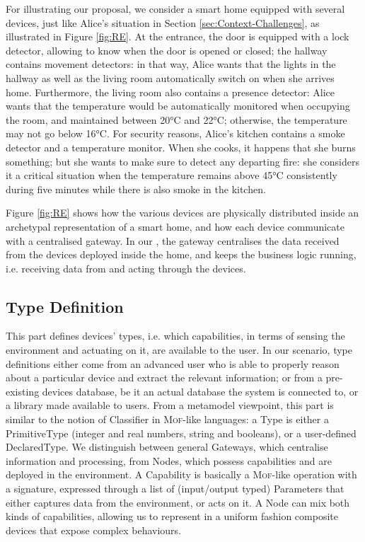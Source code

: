 For illustrating our proposal, we consider a smart home equipped with several devices, just like Alice's situation in Section \ref{sec:Context-Challenges}, as illustrated in Figure \ref{fig:RE}. At the entrance, the door is equipped with a lock detector, allowing to know when the door is opened or closed; the hallway contains movement detectors: in that way, Alice wants that the lights in the hallway as well as the living room automatically switch on when she arrives home. Furthermore, the living room also contains a presence detector: Alice wants that the temperature would be automatically monitored when occupying the room, and maintained between 20°C and 22°C; otherwise, the temperature may not go below 16°C. For security reasons, Alice's kitchen contains a smoke detector and a temperature monitor. When she cooks, it happens that she burns something; but she wants to make sure to detect any departing fire: she considers it a critical situation when the temperature remains above 45°C consistently during five minutes while there is also smoke in the kitchen. 


Figure \ref{fig:RE} shows how the various devices are physically distributed inside an archetypal representation of a smart home, and how each device communicate with a centralised gateway. In our \DSL, the gateway centralises the data received from the devices deployed inside the home, and keeps the business logic running, i.e. receiving data from and acting through the devices. 

\subsection{Type Definition}
\label{sec:IoTDSL-Type}

This part defines \IOT devices' types, i.e. which capabilities, in terms of sensing the environment and actuating on it, are available to the user. In our scenario, type definitions either come from an advanced user who is able to properly reason about a particular device and extract the relevant information; or from a pre-existing devices database, be it an actual database the system is connected to, or a library made available to users. From a metamodel viewpoint, this part is similar to the notion of \textsf{Classifier} in \textsc{Mof}-like languages: a \textsf{Type} is either a \textsf{PrimitiveType} (integer and real numbers, string and booleans), or a user-defined \textsf{DeclaredType}. We distinguish between general \textsf{Gateway}s, which centralise information and processing, from \textsf{Node}s, which possess capabilities and are deployed in the environment. A \textsf{Capability} is basically a \textsc{Mof}-like operation with a signature, expressed through a list of (input/output typed) \textsf{Parameter}s that either captures data from the environment, or acts on it. A \textsf{Node} can mix both kinds of capabilities, allowing us to represent in a uniform fashion composite devices that expose complex behaviours.
	
